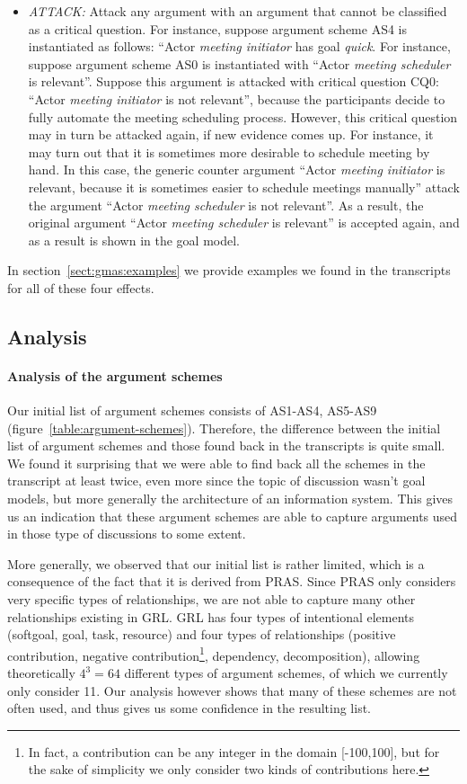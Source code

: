 \begin{itemize}
\item \emph{ATTACK:} Attack any argument with an argument that cannot be classified as a critical question. For instance, suppose argument scheme AS4 is instantiated as follows: ``Actor \emph{meeting initiator} has goal \emph{quick}. For instance, suppose argument scheme AS0 is instantiated with ``Actor \emph{meeting scheduler} is relevant''. Suppose this argument is attacked with critical question CQ0: ``Actor \emph{meeting initiator} is not relevant'', because the participants decide to fully automate the meeting scheduling process. However, this critical question may in turn be attacked again, if new evidence comes up. For instance, it may turn out that it is sometimes more desirable to schedule meeting by hand. In this case, the generic counter argument ``Actor \emph{meeting initiator} is relevant, because it is sometimes easier to schedule meetings manually'' attack the argument ``Actor \emph{meeting scheduler} is not relevant''. As a result, the original argument ``Actor \emph{meeting scheduler} is relevant'' is accepted again, and as a result is shown in the goal model.
\end{itemize}

In section~\ref{sect:gmas:examples} we provide examples we found in the transcripts for all of these four effects.

\subsection{Analysis}
\label{sect:gmas:transcripts:analysis}

\paragraph{Analysis of the argument schemes}
Our initial list of argument schemes consists of AS1-AS4, AS5-AS9 (figure~\ref{table:argument-schemes}). Therefore, the difference between the initial list of argument schemes and those found back in the transcripts is quite small. We found it surprising that we were able to find back all the schemes in the transcript at least twice, even more since the topic of discussion wasn't goal models, but more generally the architecture of an information system. This gives us an indication that these argument schemes are able to capture arguments used in those type of discussions to some extent. 

More generally, we observed that our initial list is rather limited, which is a consequence of the fact that it is derived from PRAS. Since PRAS only considers very specific types of relationships, we are not able to capture many other relationships existing in GRL. GRL has four types of intentional elements (softgoal, goal, task, resource) and four types of relationships (positive contribution, negative contribution\footnote{In fact, a contribution can be any integer in the domain [-100,100], but for the sake of simplicity we only consider two kinds of contributions here.}, dependency, decomposition), allowing theoretically $4^3=64$ different types of argument schemes, of which we currently only consider 11. Our analysis however shows that many of these schemes are not often used, and thus gives us some confidence in the resulting list.

